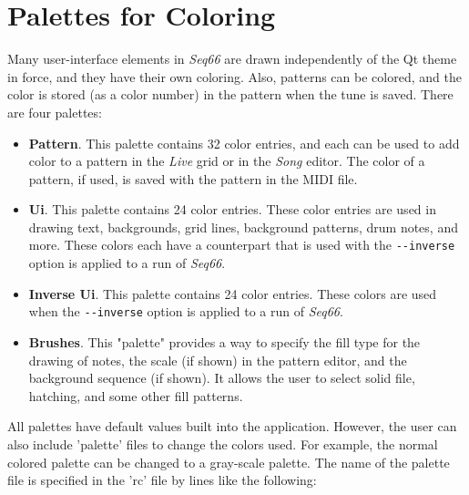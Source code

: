 %
%
%

\section{Palettes for Coloring}
\label{sec:palettes}

   Many user-interface elements in \textsl{Seq66} are drawn independently of
   the Qt theme in force, and they have their own coloring.  Also, patterns can
   be colored, and the color is stored (as a color number) in the pattern when
   the tune is saved.
   There are four palettes:

   \begin{itemize}
      \item \textbf{Pattern}.  This palette contains 32 color entries, and each
         can be used to add color to a pattern in the \textsl{Live} grid or in
         the \textsl{Song} editor.  The color of a pattern, if used, is saved
         with the pattern in the MIDI file.
      \item \textbf{Ui}.  This palette contains 24 color entries.  These
         color entries are used in drawing text, backgrounds, grid lines,
         background patterns, drum notes, and more.  These colors each have a
         counterpart that is used with the \texttt{-{}-inverse} option is
         applied to a run of \textsl{Seq66}.
      \item \textbf{Inverse Ui}.  This palette contains 24 color entries.
         These colors are used when the \texttt{-{}-inverse} option is applied
         to a run of \textsl{Seq66}.
      \item \textbf{Brushes}.  This "palette" provides a way to specify the
         fill type for the drawing of notes, the scale (if shown) in the
         pattern editor, and the background sequence (if shown).  It allows the
         user to select solid file, hatching, and some other fill patterns.
   \end{itemize}

   All palettes have default values built into the application.  However, the
   user can also include 'palette' files to change the colors used.  For
   example, the normal colored palette can be changed to a gray-scale palette.
   The name of the palette file is specified in the 'rc' file by lines like the
   following:

